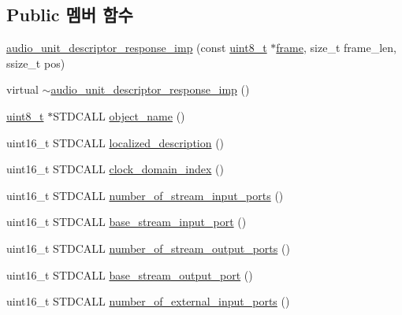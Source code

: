 \subsection*{Public 멤버 함수}
\begin{DoxyCompactItemize}
\item 
\hyperlink{classavdecc__lib_1_1audio__unit__descriptor__response__imp_ac59f6f0025e063137ae8794e0d183575}{audio\+\_\+unit\+\_\+descriptor\+\_\+response\+\_\+imp} (const \hyperlink{stdint_8h_aba7bc1797add20fe3efdf37ced1182c5}{uint8\+\_\+t} $\ast$\hyperlink{gst__avb__playbin_8c_ac8e710e0b5e994c0545d75d69868c6f0}{frame}, size\+\_\+t frame\+\_\+len, ssize\+\_\+t pos)
\item 
virtual \hyperlink{classavdecc__lib_1_1audio__unit__descriptor__response__imp_a45f2170b4283bde51694e18f40d84af1}{$\sim$audio\+\_\+unit\+\_\+descriptor\+\_\+response\+\_\+imp} ()
\item 
\hyperlink{stdint_8h_aba7bc1797add20fe3efdf37ced1182c5}{uint8\+\_\+t} $\ast$S\+T\+D\+C\+A\+LL \hyperlink{classavdecc__lib_1_1audio__unit__descriptor__response__imp_a15837e3eb254ad44812cb766ae8cd53c}{object\+\_\+name} ()
\item 
uint16\+\_\+t S\+T\+D\+C\+A\+LL \hyperlink{classavdecc__lib_1_1audio__unit__descriptor__response__imp_aa94307532fbb37e2f986fee8fec79373}{localized\+\_\+description} ()
\item 
uint16\+\_\+t S\+T\+D\+C\+A\+LL \hyperlink{classavdecc__lib_1_1audio__unit__descriptor__response__imp_a25f4f17a510b3f05e97806cd40751774}{clock\+\_\+domain\+\_\+index} ()
\item 
uint16\+\_\+t S\+T\+D\+C\+A\+LL \hyperlink{classavdecc__lib_1_1audio__unit__descriptor__response__imp_a6aa7998792c209c9b548aaf2556477c4}{number\+\_\+of\+\_\+stream\+\_\+input\+\_\+ports} ()
\item 
uint16\+\_\+t S\+T\+D\+C\+A\+LL \hyperlink{classavdecc__lib_1_1audio__unit__descriptor__response__imp_a1e9cd171a9f92d01448b601929a10861}{base\+\_\+stream\+\_\+input\+\_\+port} ()
\item 
uint16\+\_\+t S\+T\+D\+C\+A\+LL \hyperlink{classavdecc__lib_1_1audio__unit__descriptor__response__imp_ab73ba4e5e55bd2538ed7fcefb18ff991}{number\+\_\+of\+\_\+stream\+\_\+output\+\_\+ports} ()
\item 
uint16\+\_\+t S\+T\+D\+C\+A\+LL \hyperlink{classavdecc__lib_1_1audio__unit__descriptor__response__imp_a2c7ecc7bb2ecb96debb736a4a70ed940}{base\+\_\+stream\+\_\+output\+\_\+port} ()
\item 
uint16\+\_\+t S\+T\+D\+C\+A\+LL \hyperlink{classavdecc__lib_1_1audio__unit__descriptor__response__imp_a7189c53d848b11a6cb0e1ce77f88d5cf}{number\+\_\+of\+\_\+external\+\_\+input\+\_\+ports} ()

\end{DoxyCompactItemize}
